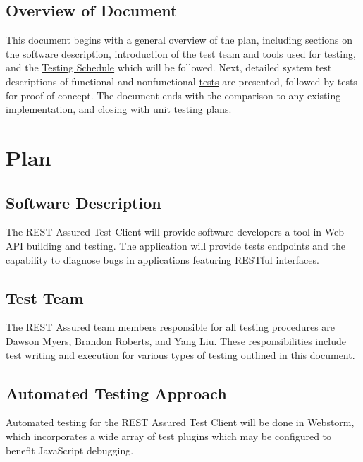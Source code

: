 \documentclass[12pt, titlepage]{article}
\begin{document}
\subsection{Overview of Document}
This document begins with a general overview of the plan, including sections on the software description, introduction of the test team and tools used for testing, and the \href{Table:sched}{Testing Schedule} which will be followed. Next, detailed system test descriptions of functional and nonfunctional \href{tests:frt:ui}{tests} are presented, followed by tests for proof of concept. The document ends with the comparison to any existing implementation, and closing with unit testing plans.


\section{Plan}

\subsection{Software Description}
The REST Assured Test Client will provide software developers a tool in Web API building and testing. The application will provide tests endpoints and the capability to diagnose bugs in applications featuring RESTful interfaces. 

\subsection{Test Team}
The REST Assured team members responsible for all testing procedures are Dawson Myers, Brandon Roberts, and Yang Liu. These responsibilities include test writing and execution for various types of testing outlined in this document.

\subsection{Automated Testing Approach}
Automated testing for the REST Assured Test Client will be done in Webstorm, which incorporates a wide array of test plugins which may be configured to benefit JavaScript debugging.
\end{document}
